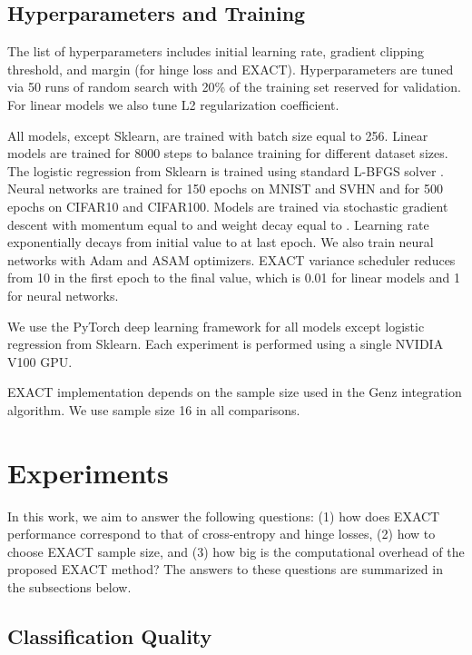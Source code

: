 \documentclass[nohyperref]{article}
\theoremstyle{plain}
\theoremstyle{definition}
\theoremstyle{remark}
\begin{document}
\subsection{Hyperparameters and Training}

The list of hyperparameters includes initial learning rate, gradient clipping threshold, and margin (for hinge loss and EXACT). Hyperparameters are tuned via 50 runs of random search with 20\% of the training set reserved for validation. For linear models we also tune L2 regularization coefficient.


All models, except Sklearn, are trained with batch size equal to 256. Linear models are trained for 8000 steps to balance training for different dataset sizes. The logistic regression from Sklearn is trained using standard L-BFGS solver \cite{byrd1995limited}. Neural networks are trained for 150 epochs on MNIST and SVHN and for 500 epochs on CIFAR10 and CIFAR100. Models are trained via stochastic gradient descent with momentum equal to  and weight decay equal to . Learning rate exponentially decays from initial value to  at last epoch.  We also train neural networks with Adam \cite{kingma2015adam} and ASAM \cite{kwon2021asam} optimizers. EXACT variance scheduler reduces  from 10 in the first epoch to the final value, which is 0.01 for linear models and 1 for neural networks.

We use the PyTorch deep learning framework \cite{paszke2019pytorch} for all models except logistic regression from Sklearn. Each experiment is performed using a single NVIDIA V100 GPU.

EXACT implementation depends on the sample size used in the Genz integration algorithm. We use sample size 16 in all comparisons.

\section{Experiments}
In this work, we aim to answer the following questions: (1) how does EXACT performance correspond to that of cross-entropy and hinge losses, (2) how to choose EXACT sample size, and (3) how big is the computational overhead of the proposed EXACT method? The answers to these questions are summarized in the subsections below.

\subsection{Classification Quality}
\end{document}
